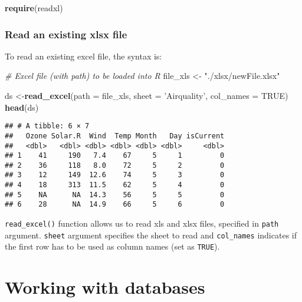 \documentclass[]{book}
\newenvironment{Shaded}{\begin{snugshade}}{\end{snugshade}}
\newcommand{\KeywordTok}[1]{\textcolor[rgb]{0.13,0.29,0.53}{\textbf{{#1}}}}
\newcommand{\DataTypeTok}[1]{\textcolor[rgb]{0.13,0.29,0.53}{{#1}}}
\newcommand{\StringTok}[1]{\textcolor[rgb]{0.31,0.60,0.02}{{#1}}}
\newcommand{\CommentTok}[1]{\textcolor[rgb]{0.56,0.35,0.01}{\textit{{#1}}}}
\newcommand{\OtherTok}[1]{\textcolor[rgb]{0.56,0.35,0.01}{{#1}}}
\newcommand{\NormalTok}[1]{{#1}}
\begin{document}
\begin{Shaded}
\begin{Highlighting}[]
\KeywordTok{require}\NormalTok{(readxl)}
\end{Highlighting}
\end{Shaded}

\subsubsection{Read an existing xlsx
file}\label{read-an-existing-xlsx-file-1}

To read an existing excel file, the syntax is:

\begin{Shaded}
\begin{Highlighting}[]
\CommentTok{# Excel file (with path) to be loaded into R}
\NormalTok{file_xls <-}\StringTok{ "./xlsx/newFile.xlsx"}
\end{Highlighting}
\end{Shaded}

\begin{Shaded}
\begin{Highlighting}[]
\NormalTok{ds <-}\KeywordTok{read_excel}\NormalTok{(}\DataTypeTok{path =} \NormalTok{file_xls, }\DataTypeTok{sheet =} \StringTok{'Airquality'}\NormalTok{, }\DataTypeTok{col_names =} \OtherTok{TRUE}\NormalTok{)}
\KeywordTok{head}\NormalTok{(ds)}
\end{Highlighting}
\end{Shaded}

\begin{verbatim}
## # A tibble: 6 × 7
##   Ozone Solar.R  Wind  Temp Month   Day isCurrent
##   <dbl>   <dbl> <dbl> <dbl> <dbl> <dbl>     <dbl>
## 1    41     190   7.4    67     5     1         0
## 2    36     118   8.0    72     5     2         0
## 3    12     149  12.6    74     5     3         0
## 4    18     313  11.5    62     5     4         0
## 5    NA      NA  14.3    56     5     5         0
## 6    28      NA  14.9    66     5     6         0
\end{verbatim}

\texttt{read\_excel()} function allows us to read xls and xlsx files,
specified in \texttt{path} argument. \texttt{sheet} argument specifies
the sheet to read and \texttt{col\_names} indicates if the first row has
to be used as column names (set as \texttt{TRUE}).

\clearpage

\section{Working with databases}\label{working-with-databases}
\end{document}
